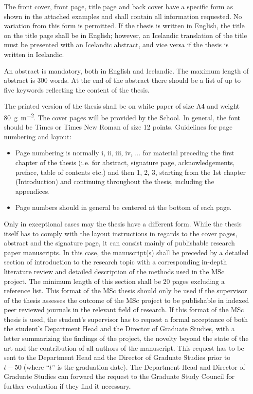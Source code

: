 The front cover, front page, title page and back cover have a specific form as shown in the attached examples and shall contain all information requested.
No variation from this form is permitted.
If the thesis is written in English, the title on the title page shall be in English; however, an Icelandic translation of the title must be presented with an Icelandic abstract, and vice versa if the thesis is written in Icelandic.

An abstract is mandatory, both in English and Icelandic.
The maximum length of abstract is 300 words.
At the end of the abstract there should be a list of up to five keywords reflecting the content of the thesis.

The printed version of the thesis shall be on white paper of size A4 and weight \SI{80}{\gram\per\square\meter}. The cover pages will be provided by the School. In general, the font should be Times or Times New Roman of size 12 points.
Guidelines for page numbering and layout:

\begin{itemize}
\item Page numbering is normally i, ii, iii, iv, ... for material preceding the first chapter of the thesis (i.e. for abstract, signature page, acknowledgements, preface, table of contents etc.) and then
1, 2, 3, starting from the 1st chapter (Introduction) and continuing throughout the thesis, including the appendices.
\item Page numbers should in general be centered at the bottom of each page.
\end{itemize}
Only in exceptional cases may the thesis have a different form.
While the thesis itself has to comply with the layout instructions in regards to the cover pages, abstract and the signature page, it can consist mainly of publishable research paper manuscripts.
In this case, the manuscript(s) shall be preceded by a detailed section of introduction to the research topic with a corresponding in-depth literature review and detailed description of the methods used in the MSc project.
The minimum length of this section shall be 20 pages excluding a reference list.
This format of the MSc thesis should only be used if the supervisor of the thesis assesses the outcome of the MSc project to be publishable in indexed peer reviewed journals in the relevant field of research.
If this format of the MSc thesis is used, the student's supervisor has to request a formal acceptance of both the student's Department Head and the Director of Graduate Studies, with a letter summarizing the findings of the project, the novelty beyond the state of the art and the contribution of all authors of the manuscript.
This request has to be sent to the Department Head and the Director of Graduate Studies prior to $t-50$ (where “$t$” is the graduation date).
The Department Head and Director of Graduate Studies can forward the request to the Graduate Study Council for further evaluation if they find it necessary.

